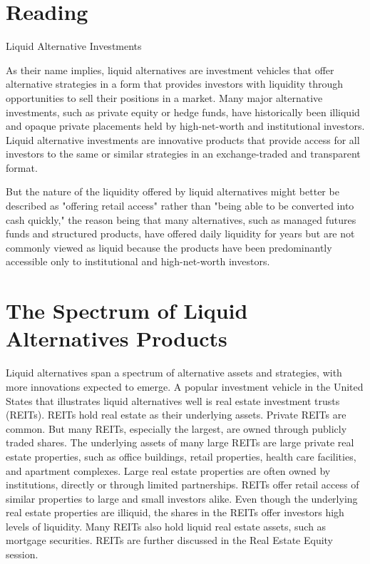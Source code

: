 \documentclass[11pt]{article}
\begin{document}
\section*{Reading}
Liquid Alternative Investments

As their name implies, liquid alternatives are investment vehicles that offer alternative strategies in a form that provides investors with liquidity through opportunities to sell their positions in a market. Many major alternative investments, such as private equity or hedge funds, have historically been illiquid and opaque private placements held by high-net-worth and institutional investors. Liquid alternative investments are innovative products that provide access for all investors to the same or similar strategies in an exchange-traded and transparent format.

But the nature of the liquidity offered by liquid alternatives might better be described as "offering retail access" rather than "being able to be converted into cash quickly," the reason being that many alternatives, such as managed futures funds and structured products, have offered daily liquidity for years but are not commonly viewed as liquid because the products have been predominantly accessible only to institutional and high-net-worth investors.

\section*{The Spectrum of Liquid Alternatives Products}
Liquid alternatives span a spectrum of alternative assets and strategies, with more innovations expected to emerge. A popular investment vehicle in the United States that illustrates liquid alternatives well is real estate investment trusts (REITs). REITs hold real estate as their underlying assets. Private REITs are common. But many REITs, especially the largest, are owned through publicly traded shares. The underlying assets of many large REITs are large private real estate properties, such as office buildings, retail properties, health care facilities, and apartment complexes. Large real estate properties are often owned by institutions, directly or through limited partnerships. REITs offer retail access of similar properties to large and small investors alike. Even though the underlying real estate properties are illiquid, the shares in the REITs offer investors high levels of liquidity. Many REITs also hold liquid real estate assets, such as mortgage securities. REITs are further discussed in the Real Estate Equity session.
\end{document}
